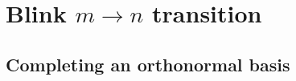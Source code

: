 \documentclass{theoretics}
\begin{document}
%
%
%
%
%
%
%
%
%
%
%
%
%
%

%

%
%
%
%
%
%
%
%
%
%

%
%
%
%
%
%
%
	
%
%
%
%
%
%
%

%
%
%
	
%
%
%
%

%
%
%
%
%
%
%
%
%
%
%
%
%
%
%
%



%
%
%
%
%
%
%
%
%
%
%
%
%
%
%
%
%
%
%
%
%
%
%
%
%
%
%
%
%
%
%
%
%
%
%
%
%
%
%
%
%

%

%
%
%
%
%

%
%
%
%
%
%

%
%
%
%
%
%
%
%
%
%
%
%
%
%
%
%
%
%
%
%
%
%
%
%
%
%
%
%
%
%
%
%
%
%
%
%
%
%
%
%

%
%
%
%
%
%
%
%
%
%
%
%
%
%
%
%
%
%
%
%
%
%
%
%
%
%
%
%
%
%
%
%
%
%
%
%
%
%
%
%
%
%
	
%
%
%
%
%
%
%
%
%
%
%
%
%
%
%
%
%
%
%
%
%
%
%
%
%
%
%
%
%
%









\section{Blink \texorpdfstring{$m\to n$}{m -> n} transition}\label{sec:Blinkered-transition}

\subsection{Completing an orthonormal basis}\label{subsec:completebasis}
\end{document}

